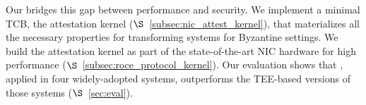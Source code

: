 



 Our \projecttitle{} bridges this gap between performance and security. We implement a minimal TCB, the attestation kernel ($\S$~\ref{subsec:nic_attest_kernel}), that materializes all the necessary properties for transforming systems for Byzantine settings. We build the attestation kernel as part of the state-of-the-art NIC hardware for high performance ($\S$~\ref{subsec:roce_protocol_kernel}). Our evaluation shows that \projecttitle{}, applied in four widely-adopted systems, outperforms the TEE-based versions of those systems ($\S$~\ref{sec:eval}).


